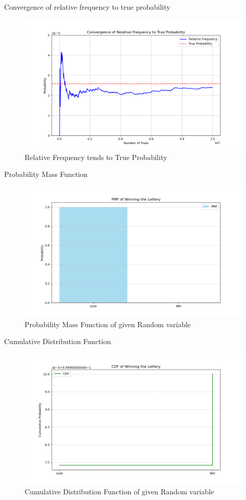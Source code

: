 \documentclass{beamer}
\theoremstyle{remark}
\numberwithin{equation}{section}
\begin{document}
\begin{frame}{Convergence of relative frequency to true probability}
\begin{figure}[h!]
   \centering
   \includegraphics[width=0.7\columnwidth]{figs/fig.png}
    \caption{Relative Frequency tends to True Probability}
\end{figure}
\end{frame}
\begin{frame}{Probability Mass Function}
\begin{figure}[h!]
   \centering
   \includegraphics[width=0.7\columnwidth]{figs/pmf.png}
    \caption{Probability Mass Function of given Random variable}
\end{figure}
\end{frame}
\begin{frame}{Cumulative Distribution Function}
\begin{figure}[h!]
   \centering
   \includegraphics[width=0.7\columnwidth]{figs/cdf.png}
    \caption{Cumulative Distribution Function of given Random variable}
\end{figure}
\end{frame}
\end{document}
